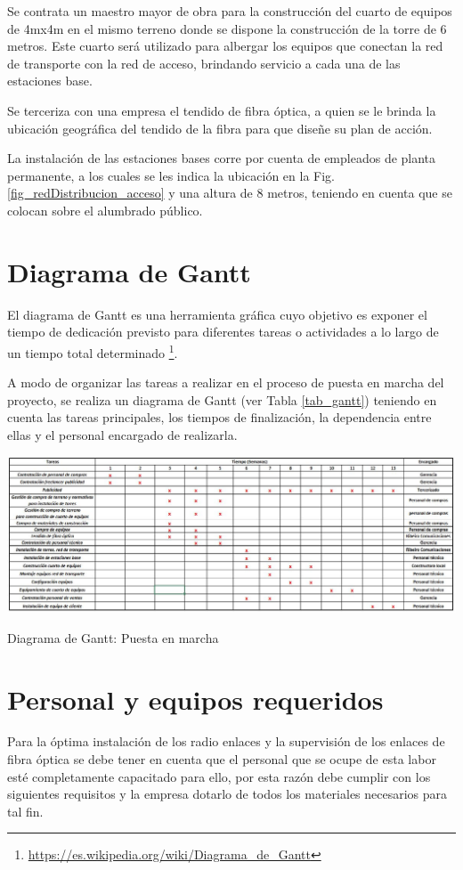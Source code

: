 \documentclass[12pt,a4paper]{book}
\begin{document}
Se contrata un maestro mayor de obra para la construcción del cuarto de equipos de 4mx4m en el mismo terreno donde se dispone la construcción de la torre de 6 metros. Este cuarto será utilizado para albergar los equipos que conectan la red de transporte con la red de acceso, brindando servicio a cada una de las estaciones base.

Se terceriza con una empresa el tendido de fibra óptica, a quien se le brinda la ubicación geográfica del tendido de la fibra para que diseñe su plan de acción.

La instalación de las estaciones bases corre por cuenta de empleados de planta permanente, a los cuales se les indica la ubicación en la Fig. \ref{fig_redDistribucion_acceso} y una altura de 8 metros, teniendo en cuenta que se colocan sobre el alumbrado público.

\section{Diagrama de Gantt}
El diagrama de Gantt es una herramienta gráfica cuyo objetivo es exponer el tiempo de dedicación previsto para diferentes tareas o actividades a lo largo de un tiempo total determinado \footnote{\url{https://es.wikipedia.org/wiki/Diagrama_de_Gantt}}.

A modo de organizar las tareas a realizar en el proceso de puesta en marcha del proyecto, se realiza un diagrama de Gantt (ver Tabla \ref{tab_gantt}) teniendo en cuenta las tareas principales, los tiempos de finalización, la dependencia entre ellas y el personal encargado de realizarla.

\begin{table} [H]
\centering
\includegraphics[width= 17 cm]{../figuras/Diagrama_Gantt.jpg}
\caption{Diagrama de Gantt: Puesta en marcha}
\label{tab_gantt}
\end{table}




\section{Personal y equipos requeridos}
Para la óptima instalación de los radio enlaces y la supervisión de los enlaces de fibra óptica se debe tener en cuenta que el personal que se ocupe de esta labor esté completamente capacitado para ello, por esta razón debe cumplir con los siguientes requisitos y la empresa dotarlo de todos los materiales necesarios para tal fin.
\end{document}
